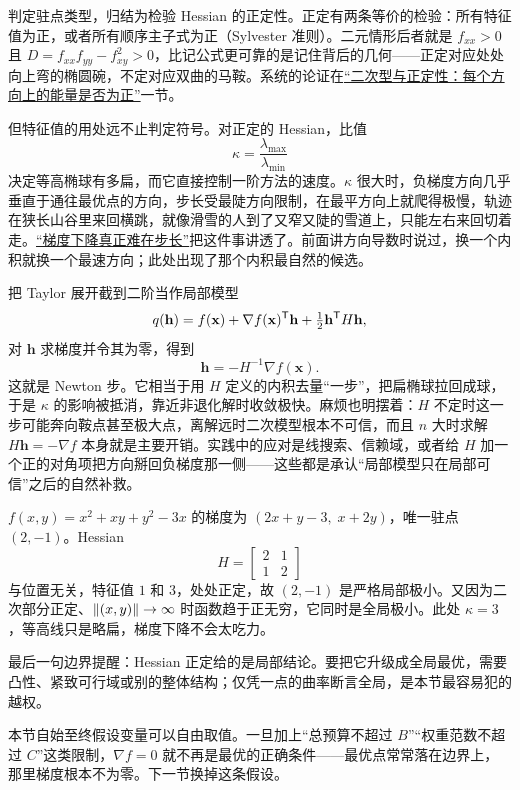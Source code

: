 判定驻点类型，归结为检验 Hessian 的正定性。正定有两条等价的检验：所有特征值为正，或者所有顺序主子式为正（Sylvester 准则）。二元情形后者就是 \(f_{xx}>0\) 且 \(D=f_{xx}f_{yy}-f_{xy}^2>0\)，比记公式更可靠的是记住背后的几何——正定对应处处向上弯的椭圆碗，不定对应双曲的马鞍。系统的论证在\hyperref[sec:03-Linear-Algebra/06-Symmetric-and-Positive-Definite-Matrices/02]{``二次型与正定性：每个方向上的能量是否为正''}一节。

但特征值的用处远不止判定符号。对正定的 Hessian，比值
\[
\kappa=\frac{\lambda_{\max}}{\lambda_{\min}}
\]
决定等高椭球有多扁，而它直接控制一阶方法的速度。\(\kappa\) 很大时，负梯度方向几乎垂直于通往最优点的方向，步长受最陡方向限制，在最平方向上就爬得极慢，轨迹在狭长山谷里来回横跳，就像滑雪的人到了又窄又陡的雪道上，只能左右来回切着走。\hyperref[sec:09-Convex-Optimization/06-Optimization-Algorithms/01]{``梯度下降真正难在步长''}把这件事讲透了。前面讲方向导数时说过，换一个内积就换一个最速方向；此处出现了那个内积最自然的候选。

把 Taylor 展开截到二阶当作局部模型
\[
q(\mathbf h)=f(\mathbf x)+\nabla f(\mathbf x)^{\mathsf{T}}\mathbf h+\tfrac12\mathbf h^{\mathsf{T}}H\mathbf h,
\]
对 \(\mathbf h\) 求梯度并令其为零，得到
\[
\mathbf h=-H^{-1}\nabla f(\mathbf x).
\]
这就是 Newton 步。它相当于用 \(H\) 定义的内积去量``一步''，把扁椭球拉回成球，于是 \(\kappa\) 的影响被抵消，靠近非退化解时收敛极快。麻烦也明摆着：\(H\) 不定时这一步可能奔向鞍点甚至极大点，离解远时二次模型根本不可信，而且 \(n\) 大时求解 \(H\mathbf h=-\nabla f\) 本身就是主要开销。实践中的应对是线搜索、信赖域，或者给 \(H\) 加一个正的对角项把方向掰回负梯度那一侧——这些都是承认``局部模型只在局部可信''之后的自然补救。

\begin{example}
\(f(x,y)=x^2+xy+y^2-3x\) 的梯度为 \((2x+y-3,\;x+2y)\)，唯一驻点 \((2,-1)\)。Hessian
\[
H=\begin{bmatrix}2&1\\1&2\end{bmatrix}
\]
与位置无关，特征值 \(1\) 和 \(3\)，处处正定，故 \((2,-1)\) 是严格局部极小。又因为二次部分正定、\(\left\lVert(x,y)\right\rVert\to\infty\) 时函数趋于正无穷，它同时是全局极小。此处 \(\kappa=3\)，等高线只是略扁，梯度下降不会太吃力。
\end{example}

最后一句边界提醒：Hessian 正定给的是局部结论。要把它升级成全局最优，需要凸性、紧致可行域或别的整体结构；仅凭一点的曲率断言全局，是本节最容易犯的越权。

本节自始至终假设变量可以自由取值。一旦加上``总预算不超过 \(B\)''``权重范数不超过 \(C\)''这类限制，\(\nabla f=0\) 就不再是最优的正确条件——最优点常常落在边界上，那里梯度根本不为零。下一节换掉这条假设。
